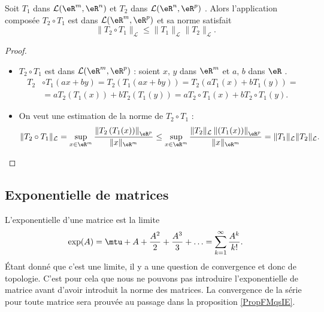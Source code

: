 \begin{proposition}
  Soit $T_1$ dans $\mathcal{L}(\eR^m, \eR^n)$ et $T_2$ dans $\mathcal{L}(\eR^n, \eR^p)$ . Alors l'application composée $T_2\circ T_1 $ est dans $\mathcal{L}(\eR^m, \eR^p)$ et sa norme satisfait
  \begin{equation}  \label{EqFwTvwI}
\|T_2\circ T_1 \|_{\mathcal{L}}\leq\|T_1\|_{\mathcal{L}} \|T_2\|_{\mathcal{L}}.
  \end{equation}
\end{proposition}
\begin{proof}
  \begin{itemize}
  \item $T_2\circ T_1 $ est dans $\mathcal{L}(\eR^m, \eR^p)$ : soient $x,\, y$ dans $\eR^m$ et $a,\, b$ dans $\eR$ . 
    \begin{equation}\nonumber
      \begin{aligned}
       T_2&\circ T_1 (ax+by)= T_2\left(T_1(ax+by)\right)=T_2(aT_1(x)+bT_1(y))=\\
&= aT_2\left(T_1(x)\right)+ bT_2\left(T_1(y)\right) = aT_2\circ T_1(x)+ bT_2\circ T_1(y). 
      \end{aligned}
    \end{equation}  
\item
	On veut une estimation de la norme de $T_2\circ T_1 $ :
\[
\|T_2\circ T_1 \|_{\mathcal{L}}= \sup_{x\in\eR^m}\frac{\left\|T_2\left(T_1(x)\right)\right\|_{\eR^p}}{\|x\|_{\eR^m}}\leq  \sup_{x\in\eR^m}\frac{\|T_2\|_{\mathcal{L}}\left\|\left(T_1(x)\right)\right\|_{\eR^p}}{\|x\|_{\eR^m}} =\|T_1\|_{\mathcal{L}} \|T_2\|_{\mathcal{L}}.
\]
  \end{itemize}
\end{proof}

\subsection{Exponentielle de matrices}

L'exponentielle d'une matrice est la limite
\begin{equation}
    \exp(A)=\mtu+A+\frac{ A^2 }{ 2 }+\frac{ A^3 }{ 3 }+\ldots =\sum_{k=1}^{\infty}\frac{ A^k }{ k! }.
\end{equation}
Étant donné que c'est une limite, il y a une question de convergence et donc de topologie. C'est pour cela que nous ne pouvons pas introduire l'exponentielle de matrice avant d'avoir introduit la norme des matrices. La convergence de la série pour toute matrice sera prouvée au passage dans la proposition \ref{PropFMqsIE}.


